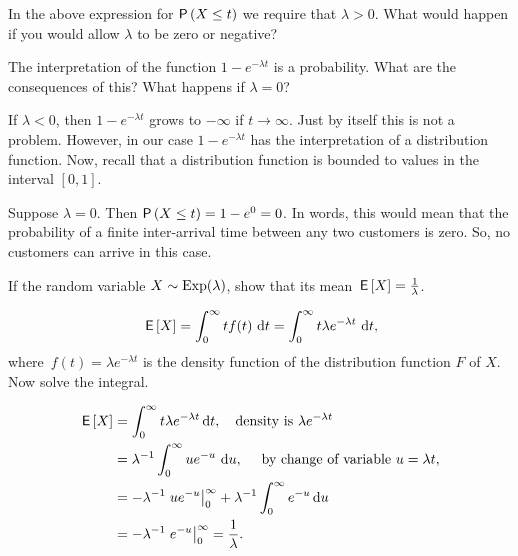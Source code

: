 \begin{extra}
In the above expression for $\P{X\leq t}$ we require that $\lambda>0$. What would happen if you would allow $\lambda$ to be zero or negative?
\begin{hint}
 The interpretation of the function $1-e^{-\lambda t}$ is a probability. What are the consequences of this? What happens if $\lambda=0$?
\end{hint}
\begin{solution}
 If $\lambda<0$, then $1-e^{-\lambda t}$ grows to $-\infty$ if $t\to \infty$. Just by itself this is not a problem. However, in our case $1-e^{-\lambda t}$ has the interpretation of a distribution function. Now, recall that a distribution function is bounded to values in the interval $[0,1]$.

Suppose $\lambda=0$. Then $\P{X\leq t} = 1-e^{0} = 0$. In words, this would mean that the probability of a finite inter-arrival time between any two customers is zero. So, no customers can arrive in this case. 
\end{solution}
\end{extra}


\begin{exercise}
 If the random variable $X\sim\operatorname{Exp}(\lambda)$, show that its mean $\,\mathsf{E}\left[X\right] = \frac{1}\lambda$. 
\begin{hint}
 \begin{equation*}
 \,\mathsf{E}\left[X\right] = \int_0^\infty t f(t)\, \,\text{d}t =
 \int_0^\infty t \lambda e^{-\lambda t}\, \,\text{d}t,
 \end{equation*}
 where~$f(t)=\lambda e^{-\lambda t}$ is the density function of the distribution function $F$ of $X$. Now solve the integral.
\end{hint}
\begin{solution}
 \begin{align*}
\,\mathsf{E}\left[X\right] 
&= \int_0^\infty t \lambda e^{-\lambda t} \,\text{d}t, \quad\text{density is } \lambda e^{-\lambda t} \\
&= \lambda^{-1} \int_0^\infty u e^{-u}\, \,\text{d}u, \quad \text{ by change of variable $u=\lambda t$}, \\
&= -\lambda^{-1}\left. u e^{- u}\right|_0^\infty + \lambda^{-1} \int_0^\infty e^{- u} \,\text{d}u\\
&= - \lambda^{-1} \left. e^{- u} \right|_0^\infty = \frac1\lambda.
 \end{align*}
\end{solution}
\end{exercise}


